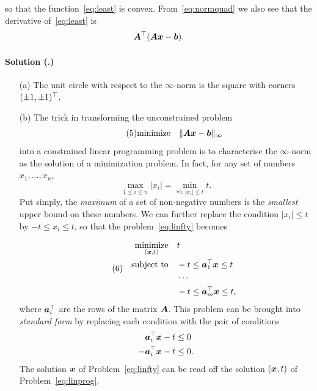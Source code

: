 \documentclass{article}
\newcounter{problemSheetNumber}
\newcounter{problems}
\renewcommand{\solution}[1]{\paragraph{Solution (\theproblemSheetNumber.\theproblems)}\addtocounter{problems}{1}\label{#1}}
\begin{document}
so that the function~\eqref{eq:least} is convex. From~\eqref{eq:normquad} we also see that the derivative of~\eqref{eq:least} is
\begin{equation*}
 \bm{A}^{\top}(\bm{A}\bm{x}-\bm{b}).
\end{equation*}

\solution{pr:3} 
\begin{itemize}
\item[(a)] The unit circle with respect to the $\infty$-norm is the square with corners $(\pm 1,\pm 1)^{\top}$.
\item[(b)] The trick in transforming the unconstrained problem
\begin{equation}\label{eq:linfty}\tag{5}
 \text{minimize}\quad \Vert {\bm{A}\bm{x}-\bm{b}}\Vert_{\infty}
\end{equation}
into a constrained linear programming problem is to characterise the $\infty$-norm as the solution of a minimization problem. In fact, for any set of numbers $x_1,\dots,x_n$,
\begin{equation*}
 \max_{1\leq i\leq n} |x_i| = \min_{\forall i\colon |x_i|\leq t} t.
\end{equation*}
Put simply, the {\em maximum} of a set of non-negative numbers is the {\em smallest} upper bound on these numbers. We can further replace the condition $|x_i|\leq t$ by $-t\leq x_i\leq t$, so that the problem~\eqref{eq:linfty} becomes

\begin{align}\label{eq:linprog}\tag{6}
\begin{split}
\mathop{\text{minimize}}_{(\bm{x},t)} \quad & t \\
\quad\text{subject to}\quad & -t \leq \bm{a}_1^{\top} \bm{x} \leq t\\
& \cdots\\
& -t \leq \bm{a}_m^{\top}\bm{x} \leq t,
\end{split}
\end{align}
where $\bm{a}_i^{\top}$ are the rows of the matrix $\bm{A}$. This problem can be brought into {\em standard form} by replacing each condition with the pair of conditions
\begin{align*}
 \bm{a}_i^{\top}\bm{x}-t &\leq 0\\
 -\bm{a}_i^{\top}\bm{x}-t & \leq 0.
\end{align*}
The solution $\bm{x}$ of Problem~\eqref{eq:linfty} can be read off the solution $(\bm{x},t)$ of Problem~\eqref{eq:linprog}.
\end{itemize}
\end{document}
